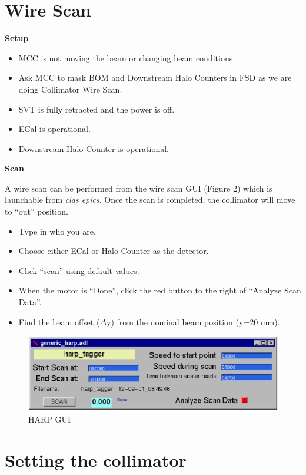 \documentclass[12pt]{report}
\begin{document}
\section{\bf Wire Scan}

\noindent
{\bf Setup}

\begin{itemize}
\item
MCC is not moving the beam or changing beam conditions
\item
Ask MCC to mask BOM and Downstream Halo Counters in FSD as we are doing Collimator Wire Scan.
\item
SVT is fully retracted and the power is off.
\item
ECal is operational.
\item
Downstream Halo Counter is operational.
\end{itemize}

\noindent
{\bf Scan}

A wire scan can be performed from the wire scan GUI (Figure 2) which is launchable from {\it clas epics}. Once the scan is completed, the collimator will move to ``out'' position.

\begin{itemize}
\item
Type in who you are.
\item
Choose either ECal or Halo Counter as the detector. 
\item
Click ``scan'' using default values.
\item
When the motor is ``Done'', click the red button to the right of ``Analyze Scan Data''.
\item
Find the beam offset ($\Delta$y) from the nominal beam position (y=20 mm).
\end{itemize}

\begin{figure}[ht!]
\centering
\includegraphics[width=12cm]{harp.eps}
\caption{HARP GUI}
\label{harp}
\end{figure}

\section{Setting the collimator}
\end{document}
